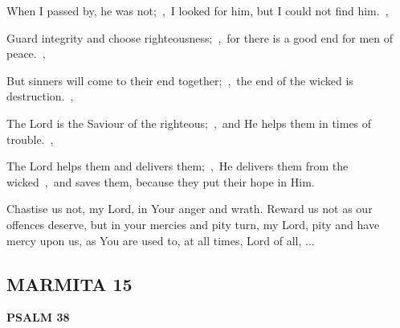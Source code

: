 \documentclass[12pt,twoside,a5paper]{article}
\newcommand{\marmita}[1]{\subsection*{MARMITA {#1}}}
\newcommand{\psalm}[1]{\textbf{PSALM {#1}}\nopagebreak}
\newcommand{\slota}[1]{\liturgicalhint{Slota.} #1}
\begin{document}
\begin{normalparskip}
  When I passed by, he was not;~\sep\ I looked for him, but I could not find him.~\sep

  Guard integrity and choose righteousness;~\sep\ for there is a good end for men of peace.~\sep

  But sinners will come to their end together;~\sep\ the end of the wicked is destruction.~\sep

  The Lord is the Saviour of the righteous;~\sep\ and He helps them in times of trouble.~\sep

  The Lord helps them and delivers them;~\sep\ He delivers them from the wicked~\sep\ and saves them, because they put their hope in Him.
\end{normalparskip}

\slota{Chastise us not, my Lord, in Your anger and wrath. Reward us not as our offences deserve, but in your mercies and pity turn, my Lord, pity and have mercy upon us, as You are used to, at all times, Lord of all, ...}

\marmita{15}

\psalm{38}
\end{document}
